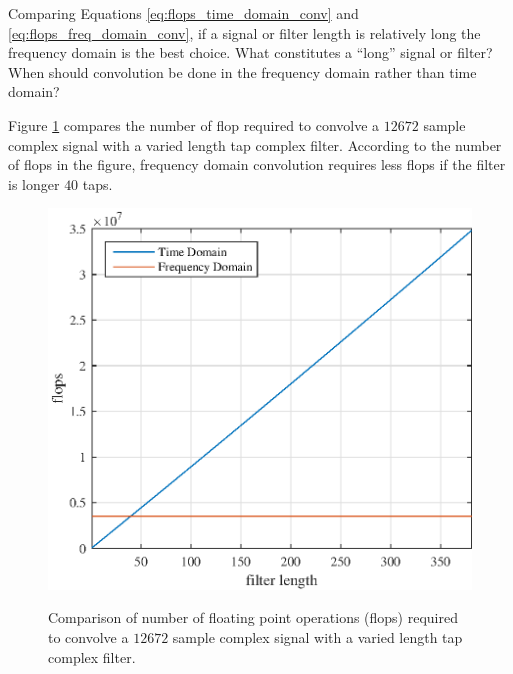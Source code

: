 Comparing Equations \ref{eq:flops_time_domain_conv} and \ref{eq:flops_freq_domain_conv}, if a signal or filter length is relatively long the frequency domain is the best choice.
What constitutes a ``long'' signal or filter?
When should convolution be done in the frequency domain rather than time domain?

Figure \ref{fig:Theory12672signal_flops} compares the number of flop required to convolve a $12672$ sample complex signal with a varied length tap complex filter.
According to the number of flops in the figure, frequency domain convolution requires less flops if the filter is longer $40$ taps.
\begin{figure}
	\caption{Comparison of number of floating point operations (flops) required to convolve a $12672$ sample complex signal with a varied length tap complex filter.}
	\centering\includegraphics[width=5in]{figures/gpu_intro/Theory12672signal_flops.eps}
	\label{fig:Theory12672signal_flops}
\end{figure}

